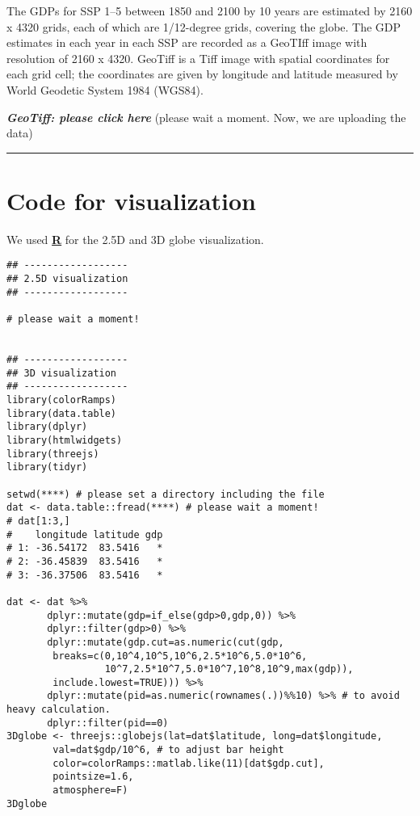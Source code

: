 \documentclass[]{book}
\begin{document}
The GDPs for SSP 1--5 between 1850 and 2100 by 10 years are estimated by 2160 x 4320 grids, each of which are 1/12-degree grids, covering the globe. The GDP estimates in each year in each SSP are recorded as a GeoTIff image with resolution of 2160 x 4320. GeoTiff is a Tiff image with spatial coordinates for each grid cell; the coordinates are given by longitude and latitude measured by World Geodetic System 1984 (WGS84).

\textbf{\emph{GeoTiff: please click here}} (please wait a moment. Now, we are uploading the data)

\begin{center}\rule{0.5\linewidth}{\linethickness}\end{center}

\hypertarget{code-for-visualization}{%
\section*{Code for visualization}\label{code-for-visualization}}

We used \href{https://www.r-project.org/}{\textbf{R}} for the 2.5D and 3D globe visualization.

\begin{verbatim}
## ------------------
## 2.5D visualization
## ------------------

# please wait a moment!


## ------------------
## 3D visualization
## ------------------
library(colorRamps)
library(data.table)
library(dplyr)
library(htmlwidgets)
library(threejs)
library(tidyr)

setwd(****) # please set a directory including the file
dat <- data.table::fread(****) # please wait a moment!
# dat[1:3,]
#    longitude latitude gdp
# 1: -36.54172  83.5416   *
# 2: -36.45839  83.5416   *
# 3: -36.37506  83.5416   *

dat <- dat %>%
       dplyr::mutate(gdp=if_else(gdp>0,gdp,0)) %>%
       dplyr::filter(gdp>0) %>%
       dplyr::mutate(gdp.cut=as.numeric(cut(gdp,
        breaks=c(0,10^4,10^5,10^6,2.5*10^6,5.0*10^6,
                 10^7,2.5*10^7,5.0*10^7,10^8,10^9,max(gdp)), 
        include.lowest=TRUE))) %>%
       dplyr::mutate(pid=as.numeric(rownames(.))%%10) %>% # to avoid heavy calculation.
       dplyr::filter(pid==0)
3Dglobe <- threejs::globejs(lat=dat$latitude, long=dat$longitude,
        val=dat$gdp/10^6, # to adjust bar height 
        color=colorRamps::matlab.like(11)[dat$gdp.cut],
        pointsize=1.6,
        atmosphere=F)
3Dglobe        
\end{verbatim}
\end{document}
